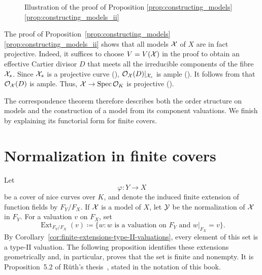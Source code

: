\begin{figure}[h!] \label{fig:illustration-of-proof-of-prop-constructing-models}
    \centering
    \caption{Illustration of the proof of Proposition \ref{prop:constructing_models}\ref{prop:constructing_models_ii}}
\end{figure}

\begin{remark}
    The proof of Proposition~\ref{prop:constructing_models}\ref{prop:constructing_models_ii} shows that all models
    $\mathcal X$ of $X$ are in fact projective.
    Indeed, it suffices to choose $V = V(\mathcal X)$ in the proof to obtain an effective Cartier divisor $D$ that meets
    all the irreducible components of the fibre $\mathcal X_s$.
    Since $\mathcal X_s$ is a projective curve (\cite[Exercise 7.5.4]{Liu}), $\mathcal{O}_\mathcal X(D)|_{\mathcal X_s}$ is ample (\cite[Proposition 7.5.5]{Liu}).
    It follows from \cite[Corollary 5.3.24]{Liu} that $\mathcal{O}_\mathcal X(D)$ is ample.
    Thus, $\mathcal X \to \operatorname{Spec} \mathcal{O}_K$ is projective (\cite[Proposition 5.3.6]{Liu}).
\end{remark}

The correspondence theorem therefore describes both the order structure on models and the construction of a model from its component valuations.
We finish by explaining its functorial form for finite covers.

\section{Normalization in finite covers}\label{sec:normalization-in-finite-covers}

Let
\[
    \varphi\colon Y\longrightarrow X
\]
be a cover of nice curves over $K$, and denote the induced finite extension of function fields by $F_Y/F_X$.
If $\mathcal X$ is a model of $X$, let $\mathcal Y$ be the normalization of $\mathcal X$ in $F_Y$.
For a valuation $v$ on $F_X$, set
\[
    \operatorname{Ext}_{F_Y/F_X}(v)
    \coloneqq
    \{w:w\text{ is a valuation on }F_Y\text{ and }w|_{F_X}=v\}.
\]
By Corollary~\ref{cor:finite-extensions-type-II-valuations}, every element of this set is a type-II valuation.
The following proposition identifies these extensions geometrically and, in particular, proves that the set is finite and nonempty.
It is Proposition~5.2 of Rüth's thesis~\cite{Rueth}, stated in the notation of this book.

